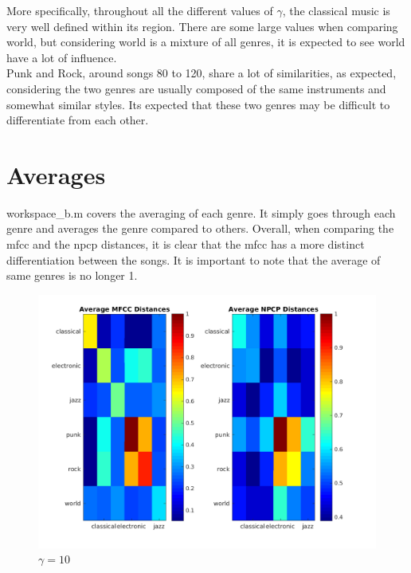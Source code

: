 \documentclass[11pt, a4paper]{article}
\begin{document}
More specifically, throughout all the different values of $\gamma$, the classical music is very well defined within its region. There are some large values when comparing world, but considering world is a mixture of all genres, it is expected to see world have a lot of influence. \\

Punk and Rock, around songs 80 to 120, share a lot of similarities, as expected, considering the two genres are usually composed of the same instruments and somewhat similar styles. Its expected that these two genres may be difficult to differentiate from each other. \\


\pagebreak
\section{Averages}

workspace\_b.m covers the averaging of each genre. It simply goes through each genre and averages the genre compared to others. Overall, when comparing the mfcc and the npcp distances, it is clear that the mfcc has a more distinct differentiation between the songs. It is important to note that the average of same genres is no longer 1. \\


\begin{figure}[H]
\hspace*{-2cm}    
    \centering
    \includegraphics[width=1.25\textwidth]{average10.png}
    \caption{$\gamma = 10$}
\end{figure}
\end{document}
